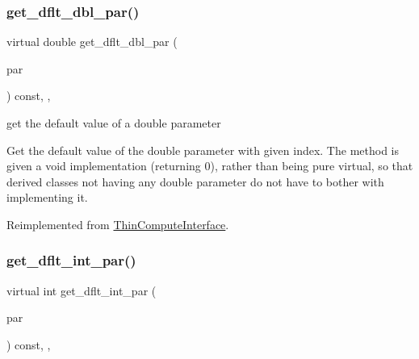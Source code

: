 \subsubsection{\texorpdfstring{get\+\_\+dflt\+\_\+dbl\+\_\+par()}{get\_dflt\_dbl\_par()}}
{\footnotesize\ttfamily virtual double get\+\_\+dflt\+\_\+dbl\+\_\+par (\begin{DoxyParamCaption}\item[{const \mbox{\hyperlink{class_s_m_spp__di__unipi__it_1_1_thin_compute_interface_aa3d710629ad8c434286726ad810c3b47}{idx\+\_\+type}}}]{par }\end{DoxyParamCaption}) const\hspace{0.3cm}{\ttfamily [inline]}, {\ttfamily [override]}, {\ttfamily [virtual]}}



get the default value of a double parameter 

Get the default value of the double parameter with given index. The method is given a void implementation (returning 0), rather than being pure virtual, so that derived classes not having any double parameter do not have to bother with implementing it. 

Reimplemented from \mbox{\hyperlink{class_s_m_spp__di__unipi__it_1_1_thin_compute_interface_ae2d249f431892cbf41ccf19204b78228}{Thin\+Compute\+Interface}}.

\mbox{\label{class_s_m_spp__di__unipi__it_1_1_f_real_objective_a75dd1491b74c4b9476755e061dce3e04}} 
\subsubsection{\texorpdfstring{get\+\_\+dflt\+\_\+int\+\_\+par()}{get\_dflt\_int\_par()}}
{\footnotesize\ttfamily virtual int get\+\_\+dflt\+\_\+int\+\_\+par (\begin{DoxyParamCaption}\item[{const \mbox{\hyperlink{class_s_m_spp__di__unipi__it_1_1_thin_compute_interface_aa3d710629ad8c434286726ad810c3b47}{idx\+\_\+type}}}]{par }\end{DoxyParamCaption}) const\hspace{0.3cm}{\ttfamily [inline]}, {\ttfamily [override]}, {\ttfamily [virtual]}}



